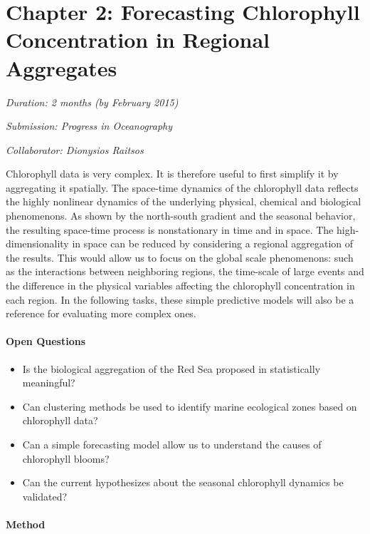 \section{Chapter 2: Forecasting Chlorophyll Concentration in Regional Aggregates}

\noindent
\emph{Duration: 2 months (by February 2015)}

\noindent
\emph{Submission: Progress in Oceanography}

\noindent
\emph{Collaborator: Dionysios Raitsos}

Chlorophyll data is very complex. It is therefore useful to first simplify it by aggregating it spatially. The space-time dynamics of the chlorophyll data reflects the highly nonlinear dynamics of the underlying physical, chemical and biological phenomenons. As shown by the north-south gradient and the seasonal behavior, the resulting space-time process is nonstationary in time and in space. The high-dimensionality in space can be reduced by considering a regional aggregation of the results. This would allow us to focus on the global scale phenomenons: such as the interactions between neighboring regions, the time-scale of large events and the difference in the physical variables affecting the chlorophyll concentration in each region. In the following tasks, these simple predictive models will also be a reference for evaluating more complex ones. 

\paragraph{Open Questions}

\begin{itemize}
  \item Is the biological aggregation of the Red Sea proposed in \cite{Raitsos2013} statistically meaningful?
  \item Can clustering methods be used to identify marine ecological zones based on chlorophyll data?
  \item Can a simple forecasting model allow us to understand the causes of chlorophyll blooms?
  \item Can the current hypothesizes about the seasonal chlorophyll dynamics be validated?
\end{itemize}

\paragraph{Method}

